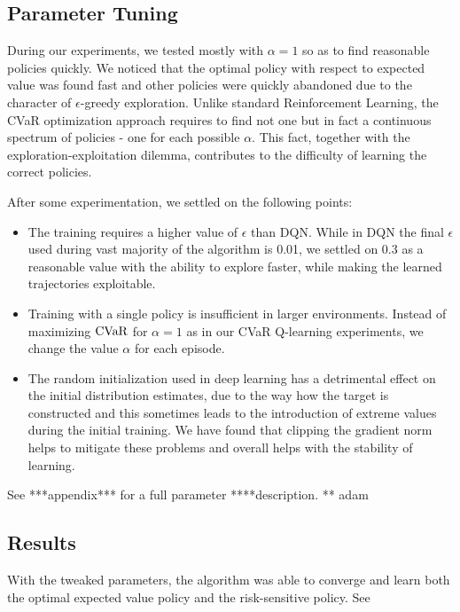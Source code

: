 \subsection{Parameter Tuning}
During our experiments, we tested mostly with $\alpha=1$ so as to find reasonable policies quickly. We noticed that the optimal policy with respect to expected value was found fast and other policies were quickly abandoned due to the character of $\epsilon$-greedy exploration. Unlike standard Reinforcement Learning, the CVaR optimization approach requires to find not one but in fact a continuous spectrum of policies - one for each possible $\alpha$. 
This fact, together with the exploration-exploitation dilemma, contributes to the difficulty of learning the correct policies.

After some experimentation, we settled on the following points: 

\begin{itemize}
\item The training requires a higher value of $\epsilon$ than DQN. While in DQN the final $\epsilon$ used during vast majority of the algorithm is 0.01, we settled on $0.3$ as a reasonable value with the ability to explore faster, while making the learned trajectories exploitable.

\item Training with a single policy is insufficient in larger environments. Instead of maximizing $\text{CVaR}$ for $\alpha=1$ as in our CVaR Q-learning experiments, we change the value $\alpha$ for each episode.

\item The random initialization used in deep learning has a detrimental effect on the initial distribution estimates, due to the way how the target is constructed and this sometimes leads to the introduction of extreme values during the initial training. We have found that clipping the gradient norm helps to mitigate these problems and overall helps with the stability of learning.
\end{itemize}

See ***appendix*** for a full parameter ****description. ** adam

\subsection{Results}

With the tweaked parameters, the algorithm was able to converge and learn both the optimal expected value policy and the risk-sensitive policy. See 

